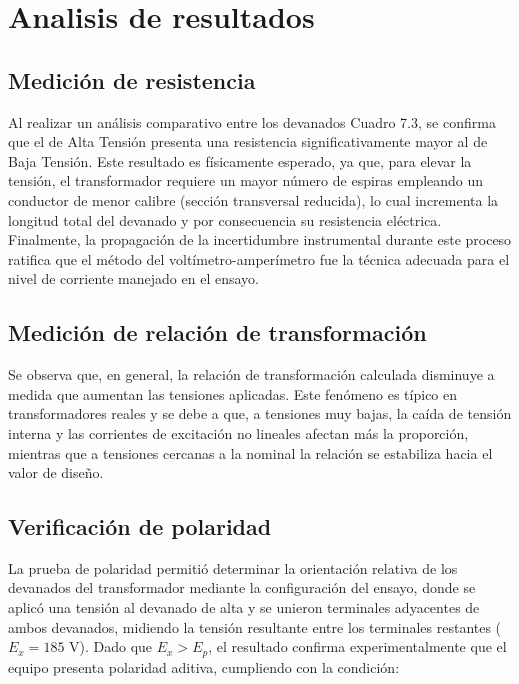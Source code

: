 \section{Analisis de resultados}

\subsection{Medición de resistencia}

Al realizar un análisis comparativo entre los devanados Cuadro 7.3, se confirma que el de Alta Tensión presenta una resistencia significativamente mayor al de Baja Tensión. Este resultado es físicamente esperado, ya que, para elevar la tensión, el transformador requiere un mayor número de espiras empleando un conductor de menor calibre (sección transversal reducida), lo cual incrementa la longitud total del devanado y por consecuencia su resistencia eléctrica. Finalmente, la propagación de la incertidumbre instrumental durante este proceso ratifica que el método del voltímetro-amperímetro fue la técnica adecuada para el nivel de corriente manejado en el ensayo.

\subsection{Medición de relación de transformación}

Se observa que, en general, la relación de transformación calculada disminuye a medida que aumentan las tensiones aplicadas. Este fenómeno es típico en transformadores reales y se debe a que, a tensiones muy bajas, la caída de tensión interna y las corrientes de excitación no lineales afectan más la proporción, mientras que a tensiones cercanas a la nominal la relación se estabiliza hacia el valor de diseño.


\subsection{Verificación de polaridad}

La prueba de polaridad permitió determinar la orientación relativa de los devanados del transformador mediante la configuración del ensayo, donde se aplicó una tensión al devanado de alta y se unieron terminales adyacentes de ambos devanados, midiendo la tensión resultante entre los terminales restantes ($E_x = 185 \text{ V}$). Dado que $E_x > E_p$, el resultado confirma experimentalmente que el equipo presenta polaridad aditiva, cumpliendo con la condición:

